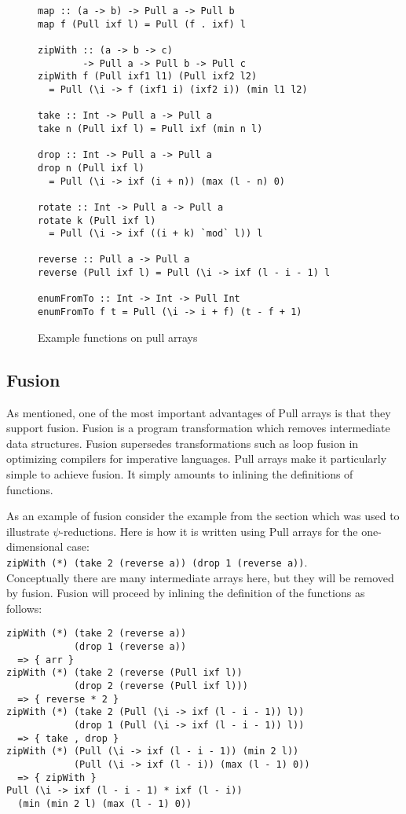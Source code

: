 \documentclass[preprint]{sigplanconf}
\begin{document}
\begin{figure}
\begin{small}
\begin{Verbatim}
map :: (a -> b) -> Pull a -> Pull b
map f (Pull ixf l) = Pull (f . ixf) l

zipWith :: (a -> b -> c)
        -> Pull a -> Pull b -> Pull c
zipWith f (Pull ixf1 l1) (Pull ixf2 l2)
  = Pull (\i -> f (ixf1 i) (ixf2 i)) (min l1 l2)

take :: Int -> Pull a -> Pull a
take n (Pull ixf l) = Pull ixf (min n l)

drop :: Int -> Pull a -> Pull a
drop n (Pull ixf l)
  = Pull (\i -> ixf (i + n)) (max (l - n) 0)

rotate :: Int -> Pull a -> Pull a
rotate k (Pull ixf l)
  = Pull (\i -> ixf ((i + k) `mod` l)) l

reverse :: Pull a -> Pull a
reverse (Pull ixf l) = Pull (\i -> ixf (l - i - 1) l

enumFromTo :: Int -> Int -> Pull Int
enumFromTo f t = Pull (\i -> i + f) (t - f + 1)
\end{Verbatim}
\end{small}
\caption{Example functions on pull arrays}
\label{fig:pullex}
\end{figure}

\subsection{Fusion}

As mentioned, one of the most important advantages of Pull arrays is
that they support
fusion\cite{gill1993short,axelsson2010feldspar,keller2010regular}. Fusion
is a program transformation which removes intermediate data structures.
Fusion supersedes transformations such
as loop fusion in optimizing compilers for imperative languages.  Pull
arrays make it particularly simple to achieve fusion. It simply
amounts to inlining the definitions of functions.

As an example of fusion consider the example from the section which
was used to illustrate $\psi$-reductions. Here is how it is written
using Pull arrays for the one-dimensional case:\\
{\small
\verb!zipWith (*) (take 2 (reverse a)) (drop 1 (reverse a))!}.\\
Conceptually there are many intermediate arrays here, but they will be
removed by fusion. Fusion will proceed by inlining the definition
of the functions as follows:

\begin{small}
\begin{Verbatim}
zipWith (*) (take 2 (reverse a))
            (drop 1 (reverse a))
  => { arr }
zipWith (*) (take 2 (reverse (Pull ixf l))
            (drop 2 (reverse (Pull ixf l)))
  => { reverse * 2 }
zipWith (*) (take 2 (Pull (\i -> ixf (l - i - 1)) l))
            (drop 1 (Pull (\i -> ixf (l - i - 1)) l))
  => { take , drop }
zipWith (*) (Pull (\i -> ixf (l - i - 1)) (min 2 l))
            (Pull (\i -> ixf (l - i)) (max (l - 1) 0))
  => { zipWith }
Pull (\i -> ixf (l - i - 1) * ixf (l - i))
  (min (min 2 l) (max (l - 1) 0))
\end{Verbatim}
\end{small}
\end{document}
